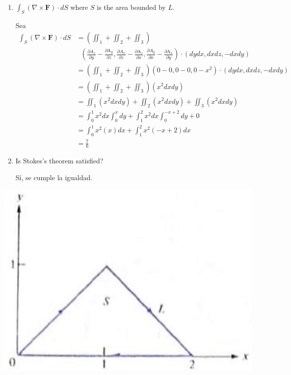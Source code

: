 \begin{problema}
\begin{enumerate}
        \item $\int_{S}(\nabla \times \mathbf{F}) \cdot d S$ where $S$ is the area bounded by $L$.
        \begin{sol}
            Sea
            \begin{align*}
                \int_{S}(\nabla \times \mathbf{F}) \cdot d S &= \left(\iint_1+\iint_2+\iint_3\right)\\
                & \ \ \ \left(\frac{\partial A_z}{\partial y}-\frac{\partial \mathrm{A}_y}{\partial z},\frac{\partial A_x}{\partial z}-\frac{\partial \mathrm{A}_z}{\partial x},
                    \frac{\partial A_y}{\partial x}-\frac{\partial \mathrm{A}_x}{\partial y}\right) \cdot \left(dydx,dxdz,-dxdy\right)\\
                    &=\left(\iint_1+\iint_2+\iint_3\right) \left(0-0,0-0,0-x^2\right) \cdot \left(dydx,dxdz,-dxdy\right)\\
                    &=\left(\iint_1+\iint_2+\iint_3\right) \left(x^2dxdy\right)\\
                    &=\iint_1\left(x^2dxdy\right) +\iint_2\left(x^2dxdy\right)+\iint_3\left(x^2dxdy\right)\\
                    &=\int_0^1 x^2dx \int_{0}^{x} dy +\int_{1}^{2}x^2dx\int_{0}^{-x+2} dy+0\\
                    &=\int_0^1 x^2(x)dx +\int_{1}^{2}x^2(-x+2)dx\\
                    &=\frac{7}{6}
            \end{align*}

        \end{sol}
        \item  Is Stokes's theorem satisfied?
        \begin{sol}
            Sí, se cumple la igualdad. 
        \end{sol}
    \end{enumerate}



\begin{center}
\includegraphics[scale=0.4]{Problemas/2023_02_02_45325701d3410451223eg-5}
\end{center}
\end{problema}

